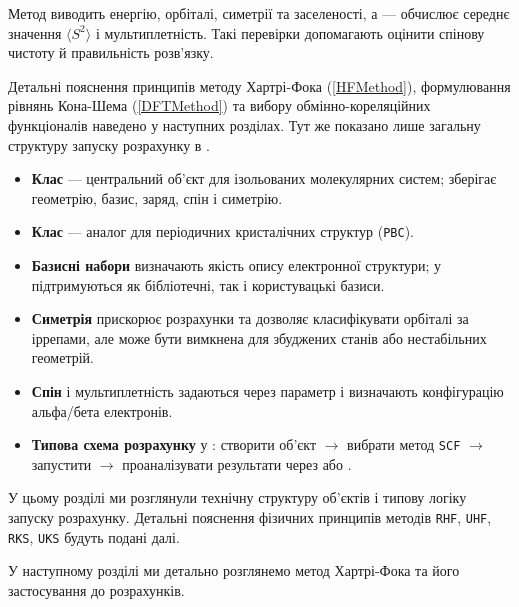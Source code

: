 Метод  виводить енергію, орбіталі, симетрії та заселеності,
а  --- обчислює середнє значення $\langle S^2 \rangle$ і мультиплетність.
Такі перевірки допомагають оцінити спінову чистоту й правильність розв’язку.

\begin{commentbox}[Примітка]
	Детальні пояснення принципів методу Хартрі-Фока (\ref{HFMethod}), формулювання рівнянь Кона-Шема (\ref{DFTMethod})
	та вибору обмінно-кореляційних функціоналів наведено у наступних розділах.
	Тут же показано лише загальну структуру запуску розрахунку в \PySCF.
\end{commentbox}


\begin{itemize}
	\item \textbf{Клас } --- центральний об'єкт для ізольованих молекулярних систем; зберігає геометрію, базис, заряд, спін і симетрію.
	\item \textbf{Клас } --- аналог  для періодичних кристалічних структур (\texttt{PBC}).
	\item \textbf{Базисні набори} визначають якість опису електронної структури; у \PySCF підтримуються як бібліотечні, так і користувацькі базиси.
	\item \textbf{Симетрія} прискорює розрахунки та дозволяє класифікувати орбіталі за іррепами, але може бути вимкнена для збуджених станів або нестабільних геометрій.
	\item \textbf{Спін} і мультиплетність задаються через параметр  і визначають конфігурацію альфа/бета електронів.
	\item \textbf{Типова схема розрахунку} у \PySCF: створити об’єкт  $\rightarrow$ вибрати метод \texttt{SCF} $\rightarrow$ запустити  $\rightarrow$ проаналізувати результати через  або .
\end{itemize}

\noindent
У цьому розділі ми розглянули технічну структуру об’єктів і типову логіку запуску розрахунку.
Детальні пояснення фізичних принципів методів \texttt{RHF}, \texttt{UHF}, \texttt{RKS}, \texttt{UKS} будуть подані далі.

У наступному розділі ми детально розглянемо метод Хартрі-Фока та його застосування до розрахунків.

